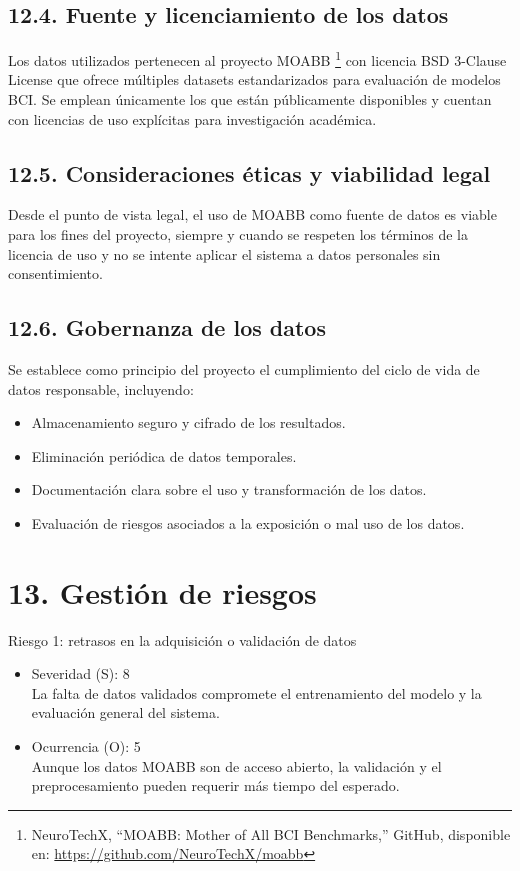 \documentclass[
11pt, %
]{charter}
\begin{document}
\subsection*{12.4. Fuente y licenciamiento de los datos}

Los datos utilizados pertenecen al proyecto MOABB \footnote{NeuroTechX, ``MOABB: Mother of All BCI Benchmarks,'' GitHub, disponible en: \url{https://github.com/NeuroTechX/moabb}} con licencia BSD 3-Clause License
que ofrece múltiples datasets estandarizados para evaluación de modelos BCI. Se emplean únicamente los que están públicamente disponibles y cuentan con licencias de uso explícitas para investigación académica.

\subsection*{12.5. Consideraciones éticas y viabilidad legal}

Desde el punto de vista legal, el uso de MOABB como fuente de datos es viable para los fines del proyecto, siempre y cuando se respeten los términos de la licencia de uso y no se intente aplicar el sistema a datos personales sin consentimiento.

\subsection*{12.6. Gobernanza de los datos}

Se establece como principio del proyecto el cumplimiento del ciclo de vida de datos responsable, incluyendo:
\begin{itemize}
  \item Almacenamiento seguro y cifrado de los resultados.
  \item Eliminación periódica de datos temporales.
  \item Documentación clara sobre el uso y transformación de los datos.
  \item Evaluación de riesgos asociados a la exposición o mal uso de los datos.
\end{itemize}


\section{13. Gestión de riesgos}
\label{sec:riesgos}

Riesgo 1: retrasos en la adquisición o validación de datos
\begin{itemize}
    \item Severidad (S): 8 \\
    La falta de datos validados compromete el entrenamiento del modelo y la evaluación general del sistema.
    \item Ocurrencia (O): 5 \\
    Aunque los datos MOABB son de acceso abierto, la validación y el preprocesamiento pueden requerir más tiempo del esperado.
\end{itemize}
\end{document}
